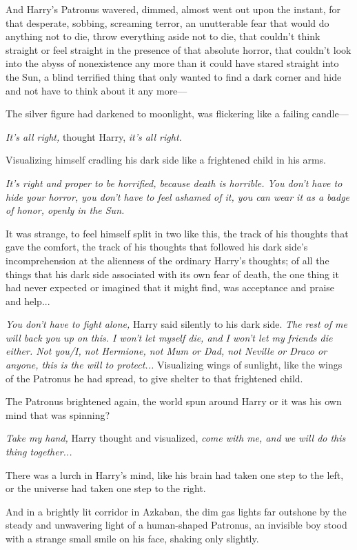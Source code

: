 And Harry’s Patronus wavered, dimmed, almost went out upon the instant, for that desperate, sobbing, screaming terror, an unutterable fear that would do anything not to die, throw everything aside not to die, that couldn’t think straight or feel straight in the presence of that absolute horror, that couldn’t look into the abyss of nonexistence any more than it could have stared straight into the Sun, a blind terrified thing that only wanted to find a dark corner and hide and not have to think about it any more—

The silver figure had darkened to moonlight, was flickering like a failing candle—

\emph{It’s all right,} thought Harry, \emph{it’s all right.}

Visualizing himself cradling his dark side like a frightened child in his arms.

\emph{It’s right and proper to be horrified, because death is horrible. You don’t have to hide your horror, you don’t have to feel ashamed of it, you can wear it as a badge of honor, openly in the Sun.}

It was strange, to feel himself split in two like this, the track of his thoughts that gave the comfort, the track of his thoughts that followed his dark side’s incomprehension at the alienness of the ordinary Harry’s thoughts; of all the things that his dark side associated with its own fear of death, the one thing it had never expected or imagined that it might find, was acceptance and praise and help...

\emph{You don’t have to fight alone,} Harry said silently to his dark side. \emph{The rest of me will back you up on this. I won’t let myself die, and I won’t let my friends die either. Not you/I, not Hermione, not Mum or Dad, not Neville or Draco or anyone, this is the will to protect...} Visualizing wings of sunlight, like the wings of the Patronus he had spread, to give shelter to that frightened child.

The Patronus brightened again, the world spun around Harry or it was his own mind that was spinning?

\emph{Take my hand,} Harry thought and visualized, \emph{come with me, and we will do this thing together...\\}

There was a lurch in Harry’s mind, like his brain had taken one step to the left, or the universe had taken one step to the right.

And in a brightly lit corridor in Azkaban, the dim gas lights far outshone by the steady and unwavering light of a human-shaped Patronus, an invisible boy stood with a strange small smile on his face, shaking only slightly.

